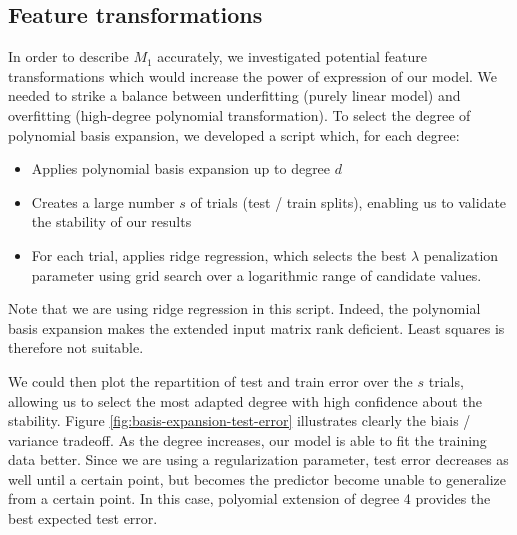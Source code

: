 \documentclass{article} %
\begin{document}
  \subsection{Feature transformations}
  In order to describe $M_1$ accurately, we investigated potential feature transformations which would increase the power of expression of our model. We needed to strike a balance between underfitting (purely linear model) and overfitting (high-degree polynomial transformation). To select the degree of polynomial basis expansion, we developed a script which, for each degree:
  \begin{itemize}
    \item Applies polynomial basis expansion up to degree $d$
    \item Creates a large number $s$ of trials (test / train splits), enabling us to validate the stability of our results
    \item For each trial, applies ridge regression, which selects the best $\lambda$ penalization parameter using grid search over a logarithmic range of candidate values.
  \end{itemize}

  Note that we are using ridge regression in this script. Indeed, the polynomial basis expansion makes the extended input matrix rank deficient. Least squares is therefore not suitable.

  We could then plot the repartition of test and train error over the $s$ trials, allowing us to select the most adapted degree with high confidence about the stability. Figure \ref{fig:basis-expansion-test-error} illustrates clearly the biais / variance tradeoff. As the degree increases, our model is able to fit the training data better. Since we are using a regularization parameter, test error decreases as well until a certain point, but becomes the predictor become unable to generalize from a certain point. In this case, polyomial extension of degree 4 provides the best expected test error.
\end{document}
